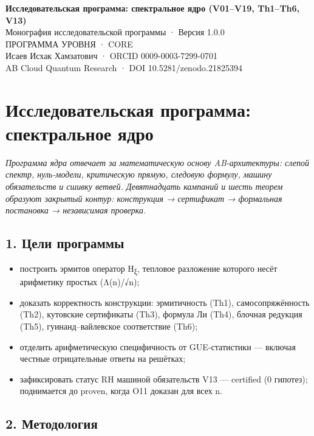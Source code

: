 \documentclass[11pt,a4paper]{article}
\begin{document}
\begin{center}
{\LARGE\bfseries Исследовательская программа: спектральное ядро (V01–V19, Th1–Th6, V13)}\\[8pt]
{\large Монография исследовательской программы · Версия 1.0.0}\\[6pt]
{\color{copper}\small ПРОГРАММА УРОВНЯ · CORE}\\[4pt]
{\small Исаев Исхак Хамзатович · ORCID 0009-0003-7299-0701}\\[2pt]
{\small AB Cloud Quantum Research · DOI 10.5281/zenodo.21825394}
\end{center}

\tableofcontents
\newpage

\section{Исследовательская программа: спектральное ядро}

\noindent\textit{\color{copper}Программа ядра отвечает за математическую основу AB-архитектуры: слепой спектр, нуль-модели, критическую прямую, следовую формулу, машину обязательств и сшивку ветвей. Девятнадцать кампаний и шесть теорем образуют закрытый контур: конструкция → сертификат → формальная постановка → независимая проверка.}

\subsection{1. Цели программы}

\begin{itemize}
  \item построить эрмитов оператор H\textsubscript{ξ}, тепловое разложение которого несёт арифметику простых (Λ(n)/√n);
  \item доказать корректность конструкции: эрмитичность (Th1), самосопряжённость (Th2), кутовские сертификаты (Th3), формула Ли (Th4), блочная редукция (Th5), гуинанд–вайлевское соответствие (Th6);
  \item отделить арифметическую специфичность от GUE-статистики — включая честные отрицательные ответы на решётках;
  \item зафиксировать статус RH машиной обязательств V13 — certified (0 гипотез); поднимается до proven, когда O11 доказан для всех n.
\end{itemize}

\subsection{2. Методология}
\end{document}
